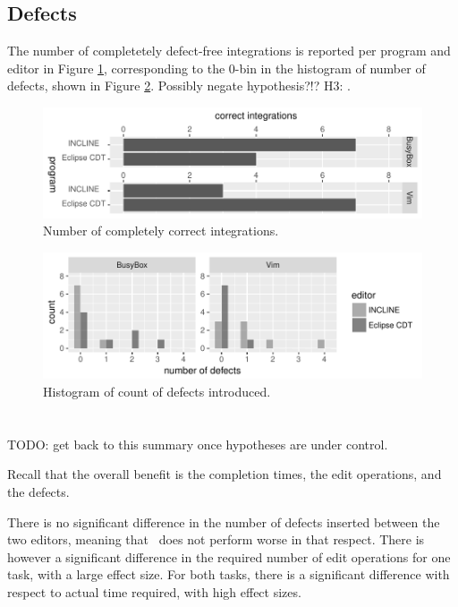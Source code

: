 \subsection{Defects}
The number of completetely defect-free integrations is reported per program and editor in Figure \ref{fig:correct-ans}, corresponding to the 0-bin in the histogram of number of defects, shown in Figure \ref{fig:defects-hist}.  Possibly negate hypothesis?!? H3: \textit{\HC}.

\begin{figure}
    \centering
    \includegraphics{figure/incl-correct-ans-r.pdf}
    \caption{Number of completely correct integrations.}
    \label{fig:correct-ans}
\end{figure}

\begin{figure}
    \centering
    \includegraphics{figure/incl-correct-histo.pdf}
    \caption{Histogram of count of defects introduced.}
    \label{fig:defects-hist}
\end{figure}


\section{\RQB}
TODO: get back to this summary once hypotheses are under control.

Recall that the overall benefit is the completion times, the edit operations, and the defects. 

There is no significant difference in the number of defects inserted between the two editors, meaning that \tooln~does not perform worse in that respect. There is however a significant difference in the required number of edit operations for one task, with a large effect size. For both tasks, there is a significant difference with respect to actual time required, with high effect sizes.

